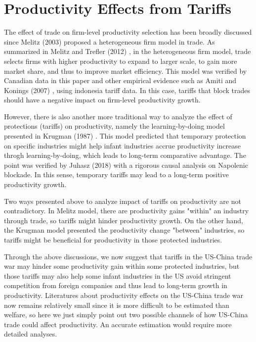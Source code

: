 \documentclass[12pt]{article}
\begin{document}
\section{Productivity Effects from Tariffs}
\label{sec:productivity}
The effect of trade on firm-level productivity selection has been broadly discussed since Melitz (2003) \cite{melitz2003impact} proposed a heterogeneous firm model in trade.
As summarized in Melitz and Trefler (2012) \cite{melitz2012gains}, in the heterogeneous firm model, trade selects firms with higher productivity to expand to larger scale, to gain more market share, and thus to improve market efficiency. 
This model was verified by Canadian data in this paper and other empirical evidence such as Amiti and Konings (2007) \cite{amiti2007trade}, using indonesia tariff data.
In this case, tariffs that block trades should have a negative impact on firm-level productivity growth. 

However, there is also another more traditional way to analyze the effect of protections (tariffs) on productivity, namely the learning-by-doing model presented in Krugman (1987) \cite{krugman1987narrow}. 
This model predicted that temporary protection on specific industries might help infant industries accrue productivity increase throgh learning-by-doing, which leads to long-term comparative advantage.
The point was verified by Juhasz (2018) \cite{juhasz2018temporary} with a rigorous causal analysis on Napolenic blockade.
In this sense, temporary tariffs may lead to a long-term positive productivity growth.

Two ways presented above to analyze impact of tariffs on productivity are not contradictory. 
In Melitz model, there are productivity gains "within" an industry through trade, so tariffs might hinder productivity growth.
On the other hand, the Krugman model presented the productivity change "between" industries, so tariffs might be beneficial for productivity in those protected industries.

Through the above discussions, we now suggest that tariffs in the US-China trade war may hinder some productivity gain within some protected industries, 
but those tariffs may also help some infant industries in the US avoid stringent competition from foreign companies and thus lead to long-term growth in productivity. 
Literatures about productivity effects on the US-China trade war now remains relatively small since it is more difficult to be estimated than welfare, 
so here we just simply point out two possible channels of how US-China trade could affect productivity. An accurate estimation would require more detailed analyses.
\end{document}

